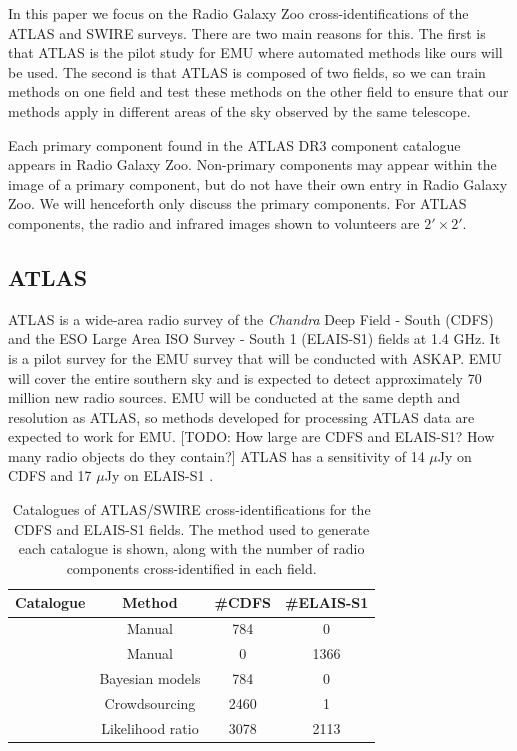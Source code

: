 \documentclass[fleqn,usenatbib,usedcolumn]{mnras}
\begin{document}
    In this paper we focus on the Radio Galaxy Zoo cross-identifications of
    the ATLAS and SWIRE surveys. There are two main reasons for this. The
    first is that ATLAS is the pilot study for EMU where automated methods
    like ours will be used. The second is that ATLAS is composed of two
    fields, so we can train methods on one field and test these methods on
    the other field to ensure that our methods apply in different areas of
    the sky observed by the same telescope.

    Each primary component found in the ATLAS DR3 component catalogue
    appears in Radio Galaxy Zoo. Non-primary components may appear within
    the image of a primary component, but do not have their own entry in
    Radio Galaxy Zoo. We will henceforth only discuss the primary
    components. For ATLAS components, the radio and infrared images shown to
    volunteers are \(2' \times 2'\).

  \subsection{ATLAS}\label{sec:atlas}

    ATLAS \citep{franzen15} is a wide-area radio survey of the \emph{Chandra}
    Deep Field - South (CDFS) and the ESO Large Area ISO Survey - South 1
    (ELAIS-S1) fields at 1.4 GHz. It is a pilot survey for the EMU
    \citep{norris11} survey that will be conducted with ASKAP. EMU will cover
    the entire southern sky and is expected to detect approximately 70 million
    new radio sources. EMU will be conducted at the same depth and resolution
    as ATLAS, so methods developed for processing ATLAS data are expected to
    work for EMU. [TODO: How large are CDFS and ELAIS-S1? How many radio
    objects do they contain?] ATLAS has a sensitivity of 14 $\mu$Jy on CDFS and
    17 $\mu$Jy on ELAIS-S1 \citep{franzen15}.

    \begin{table}
      \center
      \begin{tabular}{cc|cc}
        Catalogue & Method & \#CDFS & \#ELAIS-S1\\\hline
        \citet{norris06} & Manual & 784 & 0\\
        \citet{middelberg08} & Manual & 0 & 1366\\
        \citet{fan15} & Bayesian models & 784 & 0\\
        \citet{wong17} & Crowdsourcing & 2460 & 1 \\
        \citet{weston17} & Likelihood ratio & 3078 & 2113
      \end{tabular}
      \caption{Catalogues of ATLAS/SWIRE cross-identifications for the CDFS
        and ELAIS-S1 fields. The method used to generate each catalogue is
        shown, along with the number of radio components cross-identified in each
        field.}
      \label{tab:atlas-cids}
    \end{table}
\end{document}
